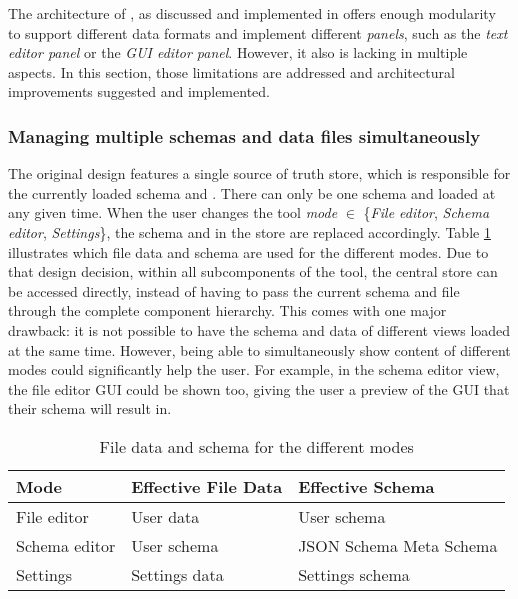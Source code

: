 The architecture of \toolname{}, as discussed and implemented in \cite{metaconfigurator} offers enough modularity to support different data formats and implement different \textit{panels}, such as the \textit{text editor panel} or the \textit{GUI editor panel}. 
However, it also is lacking in multiple aspects.
In this section, those limitations are addressed and architectural improvements suggested and implemented.

\subsubsection{Managing multiple schemas and data files simultaneously}
The original design features a single source of truth store, which is responsible for the currently loaded schema and \cfgfile{}. 
There can only be one schema and \cfgfile{} loaded at any given time.
When the user changes the tool \textit{mode} $\in$ \{\textit{File editor}, \textit{Schema editor}, \textit{Settings}\}, the schema and \cfgfile{} in the store are replaced accordingly.
Table \ref{tab:schema_and_file_data_by_mode} illustrates which file data and schema are used for the different modes.
Due to that design decision, within all subcomponents of the tool, the central store can be accessed directly, instead of having to pass the current schema and file through the complete component hierarchy. 
This comes with one major drawback: it is not possible to have the schema and data of different views loaded at the same time.
However, being able to simultaneously show content of different modes could significantly help the user.
For example, in the schema editor view, the file editor GUI could be shown too, giving the user a preview of the GUI that their schema will result in.
\begin{table}[!t]
\caption{File data and schema for the different modes}
\label{tab:schema_and_file_data_by_mode}
\centering
\begin{tabular}{lll}
\toprule
\textbf{Mode} & \textbf{Effective File Data} & \textbf{Effective Schema} \\
\midrule
File editor   & User data                    & User schema               \\
Schema editor & User schema                  & JSON Schema Meta Schema          \\
Settings      & Settings data                & Settings schema           \\
\bottomrule
\end{tabular}
\end{table}

